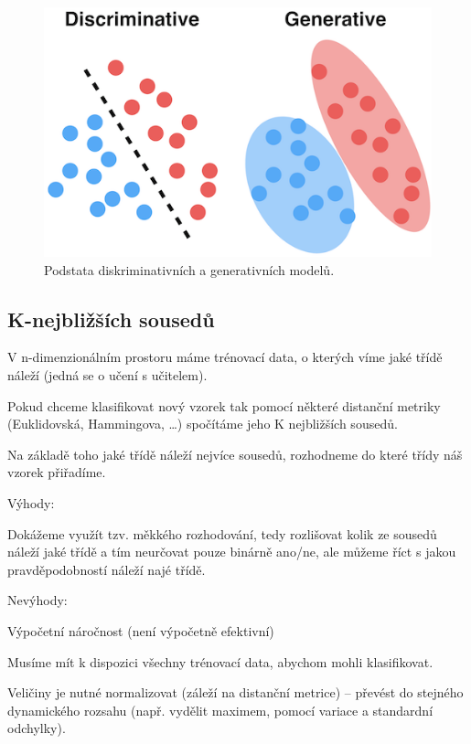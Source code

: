\begin{figure}[H]
    \centering
    \includegraphics[width=0.5\linewidth]{generative_discriminative.png}
    \caption{Podstata diskriminativních a generativních modelů.}
\end{figure}

\subsection{K-nejbližších sousedů}

\begin{compactitem}
    \item V n-dimenzionálním prostoru máme trénovací data, o kterých víme jaké třídě náleží (jedná se o učení s učitelem).

    \item Pokud chceme klasifikovat nový vzorek tak pomocí některé distanční metriky (Euklidovská, Hammingova, \dots) spočítáme jeho K nejbližších sousedů.

    \item Na základě toho jaké třídě náleží nejvíce sousedů, rozhodneme do které třídy náš vzorek přiřadíme.

    \item Výhody: \begin{compactitem}
        \item Dokážeme využít tzv. měkkého rozhodování, tedy rozlišovat kolik ze sousedů náleží jaké třídě a tím neurčovat pouze binárně ano/ne, ale můžeme říct s jakou pravděpodobností náleží najé třídě.

    \end{compactitem}
    \item Nevýhody: \begin{compactitem}
        \item Výpočetní náročnost (není výpočetně efektivní)
        \item Musíme mít k dispozici všechny trénovací data, abychom mohli klasifikovat.
        \item Veličiny je nutné normalizovat (záleží na distanční metrice) -- převést do stejného dynamického rozsahu (např. vydělit maximem, pomocí variace a standardní odchylky).
    \end{compactitem}
\end{compactitem}

